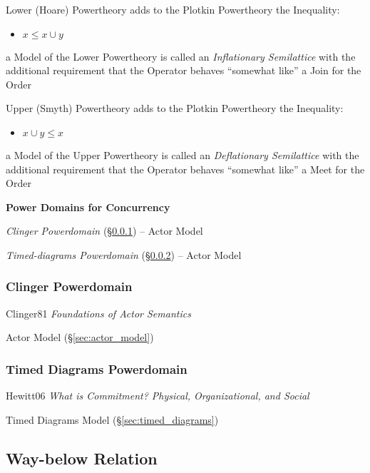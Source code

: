 Lower (Hoare) Powertheory adds to the Plotkin Powertheory the
Inequality:
\begin{itemize}
  \item $x \leq x \cup y$
\end{itemize}
a Model of the Lower Powertheory is called an \emph{Inflationary
  Semilattice} with the additional requirement that the Operator
behaves ``somewhat like'' a Join for the Order %

Upper (Smyth) Powertheory adds to the Plotkin Powertheory the
Inequality:
\begin{itemize}
  \item $x \cup y \leq x$
\end{itemize}
a Model of the Upper Powertheory is called an \emph{Deflationary
  Semilattice} with the additional requirement that the Operator
behaves ``somewhat like'' a Meet for the Order %


\textbf{Power Domains for Concurrency}

\emph{Clinger Powerdomain} (\S\ref{sec:clinger_powerdomain}) -- Actor
Model

\emph{Timed-diagrams Powerdomain}
(\S\ref{sec:timed_diagrams_powerdomain}) -- Actor Model



\subsubsection{Clinger Powerdomain}\label{sec:clinger_powerdomain}

Clinger81 \emph{Foundations of Actor Semantics}

\fist Actor Model (\S\ref{sec:actor_model})



\subsubsection{Timed Diagrams Powerdomain}
\label{sec:timed_diagrams_powerdomain}

Hewitt06 \emph{What is Commitment? Physical, Organizational, and
  Social}

\fist Timed Diagrams Model (\S\ref{sec:timed_diagrams})



\subsection{Way-below Relation}\label{sec:waybelow_relation}


